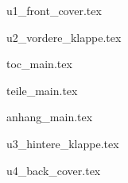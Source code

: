 \documentclass{skript}
\begin{document}
{u1_front_cover.tex}

{u2_vordere_klappe.tex}

{toc_main.tex}

{teile_main.tex}

{anhang_main.tex}

{u3_hintere_klappe.tex}

{u4_back_cover.tex}
	
\end{document}
